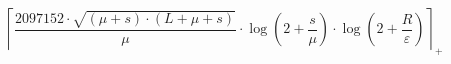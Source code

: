\[\left\lceil \frac{2097152 \cdot \sqrt{\left(\mu + s\right) \cdot \left(L + \mu + s\right)}}{\mu} \cdot \log\left(2 + \frac{s}{\mu}\right) \cdot \log\left(2 + \frac{R}{\varepsilon}\right) \right\rceil_{+}\]
